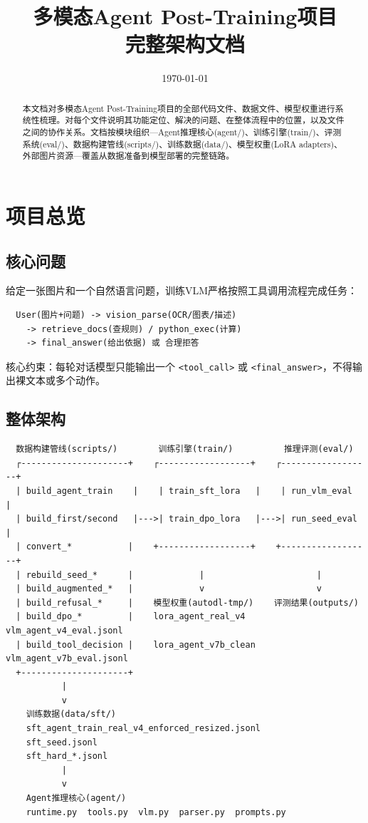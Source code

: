 \documentclass[fontset=none,11pt,a4paper]{ctexart}
\title{多模态Agent Post-Training项目\\完整架构文档}
\author{}
\date{\today}
\begin{document}
\maketitle

\begin{abstract}
本文档对多模态Agent Post-Training项目的全部代码文件、数据文件、模型权重进行系统性梳理。对每个文件说明其功能定位、解决的问题、在整体流程中的位置，以及文件之间的协作关系。文档按模块组织---Agent推理核心(agent/)、训练引擎(train/)、评测系统(eval/)、数据构建管线(scripts/)、训练数据(data/)、模型权重(LoRA adapters)、外部图片资源---覆盖从数据准备到模型部署的完整链路。
\end{abstract}

\tableofcontents

\section{项目总览}

\subsection{核心问题}

给定一张图片和一个自然语言问题，训练VLM严格按照工具调用流程完成任务：

\begin{verbatim}
  User(图片+问题) -> vision_parse(OCR/图表/描述)
    -> retrieve_docs(查规则) / python_exec(计算)
    -> final_answer(给出依据) 或 合理拒答
\end{verbatim}

核心约束：每轮对话模型只能输出一个 \texttt{<tool\_call>} 或 \texttt{<final\_answer>}，不得输出裸文本或多个动作。

\subsection{整体架构}

\begin{verbatim}
  数据构建管线(scripts/)        训练引擎(train/)          推理评测(eval/)
  ┌---------------------+    ┌------------------+    ┌------------------+
  | build_agent_train    |    | train_sft_lora   |    | run_vlm_eval     |
  | build_first/second   |--->| train_dpo_lora   |--->| run_seed_eval    |
  | convert_*           |    +------------------+    +------------------+
  | rebuild_seed_*      |             |                      |
  | build_augmented_*   |             v                      v
  | build_refusal_*     |    模型权重(autodl-tmp/)    评测结果(outputs/)
  | build_dpo_*         |    lora_agent_real_v4       vlm_agent_v4_eval.jsonl
  | build_tool_decision |    lora_agent_v7b_clean     vlm_agent_v7b_eval.jsonl
  +---------------------+
           |
           v
    训练数据(data/sft/)
    sft_agent_train_real_v4_enforced_resized.jsonl
    sft_seed.jsonl
    sft_hard_*.jsonl
           |
           v
    Agent推理核心(agent/)
    runtime.py  tools.py  vlm.py  parser.py  prompts.py
\end{verbatim}
\end{document}
